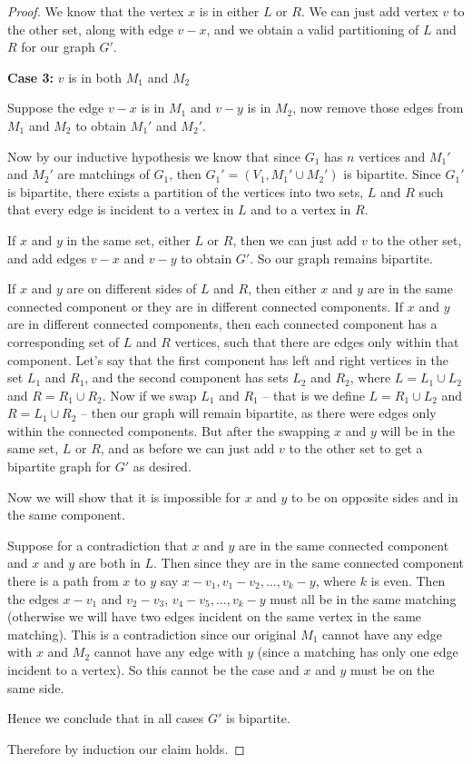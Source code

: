 \documentclass[12pt,twoside]{article} \usepackage{light}
\begin{document}
\begin{problem}{15}
{\begin{proof}
We know that the vertex $x$ is in either $L$ or $R$. We can just add
vertex $v$ to the other set, along with edge $v-x$, and we obtain a
valid partitioning of $L$ and $R$ for our graph $G'$.



\textbf{Case 3:} $v$ is in both $M_1$ and $M_2$

Suppose the edge $v-x$ is in $M_1$ and $v-y$ is in $M_2$, now remove
those edges from $M_1$ and $M_2$ to obtain $M_1'$ and $M_2'$.

Now by our inductive hypothesis we know that since $G_1$ has $n$
vertices and $M_1'$ and $M_2'$ are matchings of $G_1$, then
$G_1'=(V_1, M_1' \cup M_2')$ is bipartite. Since $G_1'$ is bipartite,
there exists a partition of the vertices into two sets, $L$ and $R$
such that every edge is incident to a vertex in $L$ and to a vertex in
$R$.

If $x$ and $y$ in the same set, either $L$ or $R$, then we can just
add $v$ to the other set, and add edges $v-x$ and $v-y$ to obtain
$G'$. So our graph remains bipartite.

If $x$ and $y$ are on different sides of $L$ and $R$, then either $x$
and $y$ are in the same connected component or they are in different
connected components. If $x$ and $y$ are in different connected
components, then each connected component has a corresponding set of
$L$ and $R$ vertices, such that there are edges only within that
component. Let's say that the first component has left and right
vertices in the set $L_1$ and $R_1$, and the second component has sets
$L_2$ and $R_2$, where $L=L_1 \cup L_2$ and $R=R_1 \cup R_2$. Now if
we swap $L_1$ and $R_1$ -- that is we define $L=R_1 \cup L_2$ and
$R=L_1 \cup R_2$ -- then our graph will remain bipartite, as there
were edges only within the connected components. But after the
swapping $x$ and $y$ will be in the same set, $L$ or $R$, and as
before we can just add $v$ to the other set to get a bipartite graph
for $G'$ as desired.

Now we will show that it is impossible for $x$ and $y$ to be on
opposite sides and in the same component.

Suppose for a contradiction that $x$ and $y$ are in the same connected
component and $x$ and $y$ are both in $L$. Then since they are in the
same connected component there is a path from $x$ to $y$ say $x-v_1,
v_1-v_2, \ldots, v_k-y$, where $k$ is even. Then the edges $x-v_1$ and
$v_2-v_3$, $v_4-v_5, \ldots, v_k-y$ must all be in the same matching
(otherwise we will have two edges incident on the same vertex in the
same matching). This is a contradiction since our original $M_1$
cannot have any edge with $x$ and $M_2$ cannot have any edge with $y$
(since a matching has only one edge incident to a vertex). So this
cannot be the case and $x$ and $y$ must be on the same side.

Hence we conclude that in all cases $G'$ is bipartite.

Therefore by induction our claim holds.
\end{proof}

}
\end{problem}
\end{document}

